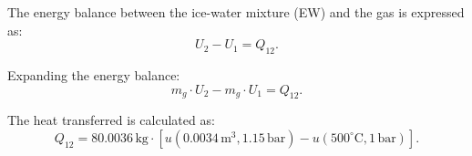 The energy balance between the ice-water mixture (EW) and the gas is expressed as:  
\[
U_2 - U_1 = Q_{12}.
\]

Expanding the energy balance:  
\[
m_g \cdot U_2 - m_g \cdot U_1 = Q_{12}.
\]

The heat transferred is calculated as:  
\[
Q_{12} = 80.0036 \, \text{kg} \cdot \left[ u(0.0034 \, \text{m}^3, 1.15 \, \text{bar}) - u(500^\circ\text{C}, 1 \, \text{bar}) \right].
\]